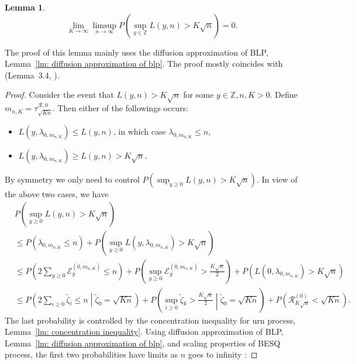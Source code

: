 \documentclass[twoside,12pt, a4paper]{article}
\newtheorem{lemma}{Lemma}[section]
\numberwithin{equation}{section}
\theoremstyle{remark}
\newcommand{\comment}[1]{\textcolor{blue}{(Comment: #1)}}
\begin{document}
	\begin{lemma}
		\label{lm: uniform control of local time}
		\[
		\lim_{K \to  \infty } \limsup_{n \to \infty } P\left( \sup_{y \in \mathbb{Z}} L\left( y, n \right) > K \sqrt{n}  \right) = 0
	.\] 
\end{lemma}
The proof of this lemma mainly uses the diffusion approximation of BLP, Lemma~\ref{lm: diffusion approximation of blp}. The proof mostly coincides with (Lemma~3.4, \cite{KP16}). 

\begin{proof}
	Consider the event that $L(y, n) > K \sqrt{n} $ for some $y \in \mathbb{Z}, n, K > 0$. Define $m_{n, K } = \tau^{\mathcal{R}, 0}_{\sqrt{K n} }$. Then either of the followings occurs:
	\begin{itemize}
		\item $L(y, \lambda_{0, m_{n, K}}) \le L(y, n)$, in which case $\lambda_{0, m_{n, K}} \le  n$,
		\item $L(y, \lambda_{0, m_{n, K}}) \ge  L(y, n)  > K \sqrt{n} $.
	\end{itemize}
	By symmetry we only need to control $P\left( \sup _{y \ge  0} L(y, n) > K \sqrt{n}  \right) $. In view of the above two cases, we have
	\begin{align*}
		&P\left( \sup _{y \ge  0} L(y, n) > K \sqrt{n}  \right) \\
		&\le P\left( \lambda_{0, m_{n, K}} \le n \right) + P\left( \sup _{y \ge 0} L\left( y, \lambda_{0, m_{n, K}}\right)   > K \sqrt{n}  \right)  \\
		&\le P\left( 2 \sum_{y \ge 0} \mathcal{E}_y^{(0,m_{n, K})} \le n \right) + P\left( \sup _{y \ge 0} \mathcal{E}_y^{\left( 0,m_{n, K} \right) }   > \frac{K \sqrt{n} }{2}  \right)+ P\left( L(0,\lambda_{0, m_{n, K}}) > K \sqrt{n}  \right)  \\
		&\le 
		P\left( 2 \sum_{i \ge  0} \tilde \zeta_i \le  n \middle| \tilde\zeta_0 = \sqrt{K n} \right) + 
		P\left( \sup _{i \ge 0} \tilde \zeta_k > \frac{K \sqrt{n} }{2} \middle| \tilde \zeta_0 = \sqrt{K n}   \right)+ 
		P\left( \mathcal{R}^{(0)} _{K \sqrt{n} } < \sqrt{K n}  \right) 
	.\end{align*}
	The last probability is controlled by the concentration inequality for urn process, Lemma~\ref{lm: concentration inequality}. Using diffusion approximation of BLP, Lemma~\ref{lm: diffusion approximation of blp}, and scaling properties of BESQ process, the first two probabilities have limits as $n$ goes to infinity :

\end{proof}
\end{document}
